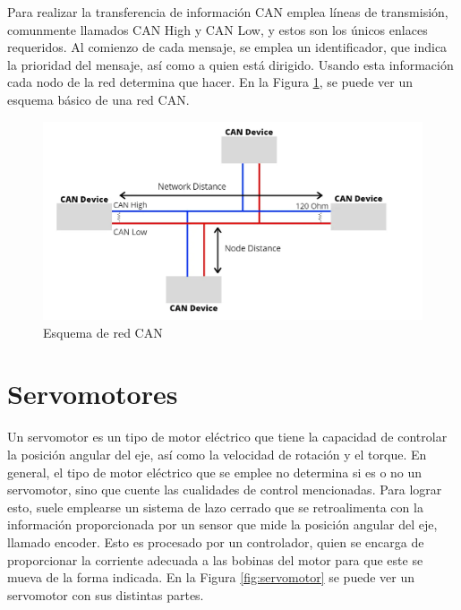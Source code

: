 

Para realizar la transferencia de información CAN emplea líneas de transmisión, comunmente llamados CAN High y CAN Low, y estos son los únicos enlaces requeridos. Al comienzo de cada mensaje, se emplea un identificador, que indica la prioridad del mensaje, así como a quien está dirigido. Usando esta información cada nodo de la red determina que hacer. En la Figura \ref{fig:canBus}, se puede ver un esquema básico de una red CAN.


\begin{figure}[htbp]
	\centering
	\includegraphics[scale=.6]{./Figures/canBus.png}
	\caption{Esquema de red CAN\protect\footnotemark}
	\label{fig:canBus}
\end{figure}


\section{Servomotores}

Un servomotor es un tipo de motor eléctrico que tiene la capacidad de controlar la posición angular del eje, así como la velocidad de rotación y el torque. En general, el tipo de motor eléctrico que se emplee no determina si es o no un servomotor, sino que cuente las cualidades de control mencionadas. Para lograr esto, suele emplearse un sistema de lazo cerrado que se retroalimenta con la información proporcionada por un sensor que mide la posición angular del eje, llamado encoder. Esto es procesado por un controlador, quien se encarga de proporcionar la corriente adecuada a las bobinas del motor para que este se mueva de la forma indicada. En la Figura \ref{fig:servomotor} se puede ver un servomotor con sus distintas partes.

